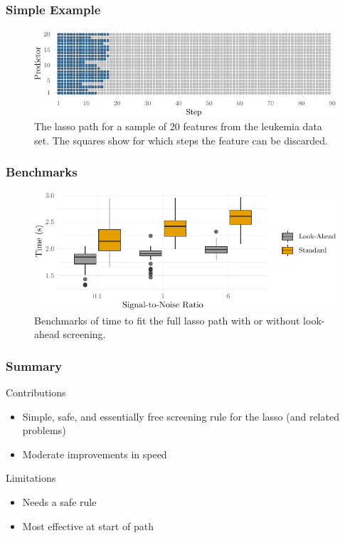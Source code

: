 \documentclass[10pt]{beamer}
\begin{document}
\begin{frame}[c]
  \frametitle{Simple Example}

  \begin{figure}[htpb]
    \centering
    \includegraphics[width=\textwidth]{figures/paper2-casestudy.pdf}
    \caption{%
      The lasso path for a sample of 20 features from the leukemia data set. The squares
      show for which steps the feature can be discarded.
    }
  \end{figure}
\end{frame}

\begin{frame}[c]
  \frametitle{Benchmarks}

  \begin{figure}[htpb]
    \centering
    \includegraphics[width=\textwidth]{figures/paper2-simulated-data.pdf}
    \caption{%
      Benchmarks of time to fit the full lasso path with or without look-ahead screening.
    }
  \end{figure}
\end{frame}

\begin{frame}[c]
  \frametitle{Summary}
  \begin{exampleblock}{Contributions}
    \begin{itemize}
      \item Simple, safe, and essentially free screening rule for the lasso (and related problems)
      \item Moderate improvements in speed
    \end{itemize}
  \end{exampleblock}

  \pause

  \begin{alertblock}{Limitations}
    \begin{itemize}
      \item Needs a safe rule
      \item Most effective at start of path
    \end{itemize}
  \end{alertblock}
\end{frame}
\end{document}
